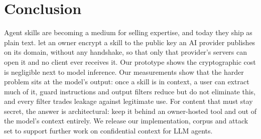 \section{Conclusion}
\label{sec:conclusion}

Agent skills are becoming a medium for selling expertise, and today they ship as plain text. \sys{}
let an owner encrypt a skill to the public key an AI provider publishes on its domain, without any
handshake, so that only that provider's servers can open it and no client ever receives it. Our
prototype shows the cryptographic cost is negligible next to model inference. Our measurements show
that the harder problem sits at the model's output: once a skill is in context, a user can
extract much of it, guard instructions and output filters reduce but do not eliminate this, and
every filter trades leakage against legitimate use. For content that must stay secret, the answer
is architectural: keep it behind an owner-hosted tool and out of the model's context entirely. We
release our implementation, corpus and attack set to support further work on confidential context
for LLM agents.
